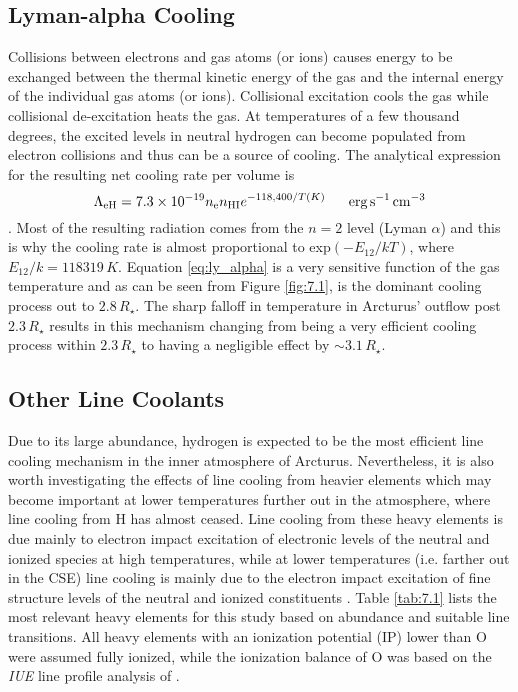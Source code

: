 \subsection{Lyman-alpha Cooling}\label{sec:7.3.3}
Collisions between electrons and gas atoms (or ions) causes energy to be exchanged between the thermal kinetic energy of the gas and the internal energy of the individual gas atoms (or ions). Collisional excitation cools the gas while collisional de-excitation heats the gas. At temperatures of a few thousand degrees, the excited levels in neutral hydrogen can become populated from electron collisions and thus can be a source of cooling. The analytical expression for the resulting net cooling rate per volume is
\begin{equation}
\label{eq:ly_alpha}
\Lambda _{\rm{eH}} = 7.3\times 10^{-19}n_{\rm{e}}n_{\rm{HI}}e^{-118,400/T(K)} \ \ \ \ \ \rm{erg\,s^{-1}\,cm^{-3}}
\end{equation}
\cite{spitzer_1978}. Most of the resulting radiation comes from the $n=2$ level (Lyman $\alpha$) and this is why the cooling rate is almost proportional to exp$(-E_{12}/kT)$, where $E_{12}/k=118319\,K$. Equation \ref{eq:ly_alpha} is a very sensitive function of the gas temperature and as can be seen from Figure \ref{fig:7.1}, is the dominant cooling process out to $2.8\,R_{\star}$. The sharp falloff in temperature in Arcturus' outflow post $2.3\,R_{\star}$ results in this mechanism changing from being a very efficient cooling process within $2.3\,R_{\star}$ to having a negligible effect by $\sim 3.1\,R_{\star}$.

\subsection{Other Line Coolants}\label{sec:7.3.4}
Due to its large abundance, hydrogen is expected to be the most efficient line cooling mechanism in the inner atmosphere of Arcturus. Nevertheless, it is also worth investigating the effects of line cooling from heavier elements which may become important at lower temperatures further out in the atmosphere, where line cooling from H has almost ceased. Line cooling from these heavy elements is due mainly to electron impact excitation of electronic levels of the neutral and ionized species at high temperatures, while at lower temperatures (i.e. farther out in the CSE) line cooling is mainly due to the electron impact excitation of fine structure levels of the neutral and ionized constituents \citep{dalgarno_1972}. Table \ref{tab:7.1} lists the most relevant heavy elements for this study based on abundance and suitable line transitions. All heavy elements with an ionization potential (IP) lower than O were assumed fully ionized,  while the ionization balance of O was based on the \textit{IUE} line profile analysis of \cite{judge_1986}.

